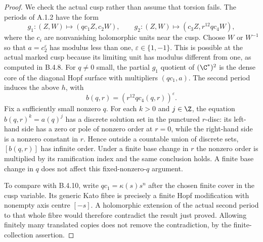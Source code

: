 \begin{proof}
We check the actual cusp rather than assume that torsion fails.
The periods of A.1.2 have the form
\[
 g_1:(Z,W)\longmapsto(q c_1 Z,c_2W),\qquad
 g_2:(Z,W)\longmapsto(c_3Z,r^{12}q c_4 W),
\]
where the $c_i$ are nonvanishing holomorphic units near the cusp.
Choose $W$ or $W^{-1}$ so that
$a=c_2^{\varepsilon}$ has modulus less than one,
$\varepsilon\in\{1,-1\}$.
This is possible at the actual marked cusp because its limiting
unit has modulus different from one, as computed in B.4.8.
For $q\ne0$ small, the partial $g_1$ quotient of $(\C^*)^2$
is the dense core of the diagonal Hopf surface with multipliers
$(q c_1,a)$. The second period induces the above $h$, with
\[
 b(q,r)=(r^{12}q c_4(q,r))^{\varepsilon}.
\]
Fix a sufficiently small nonzero $q$. For each $k>0$ and
$j\in\Z$, the equation $b(q,r)^k=a(q)^j$ has a discrete
solution set in the punctured $r$-disc: its left-hand side has
a zero or pole of nonzero order at $r=0$, while the right-hand
side is a nonzero constant in $r$.
Hence outside a countable union of discrete sets, $[b(q,r)]$
has infinite order. Under a finite base change in $r$ the
nonzero order is multiplied by its ramification index and
the same conclusion holds. A finite base change in $q$ does
not affect this fixed-nonzero-$q$ argument.

To compare with B.4.10, write $q c_1=\kappa(s)s^n$ after
the chosen finite cover in the cusp variable. Its generic Kato
fibre is precisely a finite Hopf modification with nonempty
axis centre $[-s]$. A holomorphic extension of the actual second
period to that whole fibre would therefore contradict the result
just proved. Allowing finitely many translated copies does not
remove the contradiction, by the finite-collection assertion.
\end{proof}

